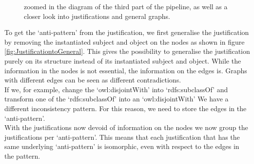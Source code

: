 \documentclass{article}
\begin{document}
\begin{figure}[!t]
	\hfill
	\caption{zoomed in the diagram of the third part of the pipeline, as well as a closer look into justifications and general graphs.}
	\label{fig:PipelinePart3}
\end{figure}
To get the `anti-pattern' from the justification, we first generalise the justification by removing the instantiated subject and object on the nodes as shown in figure \ref{fig:JustificationtoGeneral}. This gives the possibility to generalise the justification purely on its structure instead of its instantiated subject and object. While the information in the nodes is not essential, the information on the edges is. Graphs with different edges can be seen as different contradictions. \\
If we, for example, change the `owl:disjointWith' into `rdfs:subclassOf' and transform one of the `rdfs:subclassOf' into an `owl:disjointWith' We have a different inconsistency pattern. For this reason, we need to store the edges in the `anti-pattern'.\\
With the justifications now devoid of information on the nodes we now group the justifications per `anti-pattern'. This means that each justification that has the same underlying `anti-pattern' is isomorphic, even with respect to the edges in the pattern. \\
\end{document}

